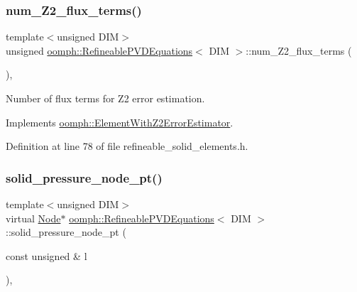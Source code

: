 \subsubsection{\texorpdfstring{num\+\_\+\+Z2\+\_\+flux\+\_\+terms()}{num\_Z2\_flux\_terms()}}
{\footnotesize\ttfamily template$<$unsigned D\+IM$>$ \\
unsigned \hyperlink{classoomph_1_1RefineablePVDEquations}{oomph\+::\+Refineable\+P\+V\+D\+Equations}$<$ D\+IM $>$\+::num\+\_\+\+Z2\+\_\+flux\+\_\+terms (\begin{DoxyParamCaption}{ }\end{DoxyParamCaption})\hspace{0.3cm}{\ttfamily [inline]}, {\ttfamily [virtual]}}



Number of \textquotesingle{}flux\textquotesingle{} terms for Z2 error estimation. 



Implements \hyperlink{classoomph_1_1ElementWithZ2ErrorEstimator_ae82c5728902e13da31be19c390fc28e3}{oomph\+::\+Element\+With\+Z2\+Error\+Estimator}.



Definition at line 78 of file refineable\+\_\+solid\+\_\+elements.\+h.

\mbox{\label{classoomph_1_1RefineablePVDEquations_a765247d85587d85802c656ca5d8d9180}} 
\subsubsection{\texorpdfstring{solid\+\_\+pressure\+\_\+node\+\_\+pt()}{solid\_pressure\_node\_pt()}}
{\footnotesize\ttfamily template$<$unsigned D\+IM$>$ \\
virtual \hyperlink{classoomph_1_1Node}{Node}$\ast$ \hyperlink{classoomph_1_1RefineablePVDEquations}{oomph\+::\+Refineable\+P\+V\+D\+Equations}$<$ D\+IM $>$\+::solid\+\_\+pressure\+\_\+node\+\_\+pt (\begin{DoxyParamCaption}\item[{const unsigned \&}]{l }\end{DoxyParamCaption})\hspace{0.3cm}{\ttfamily [inline]}, {\ttfamily [virtual]}}



